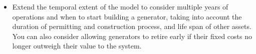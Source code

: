 \documentclass[11pt]{article}
\begin{document}
\begin{itemize}
\item Extend the temporal extent of the model to consider multiple years of operations and when to start building a generator, taking into account the duration of permitting and construction process, and life span of other assets. You can also consider allowing generators to retire early if their fixed costs no longer outweigh their value to the system.

\end{itemize}
\end{document}
